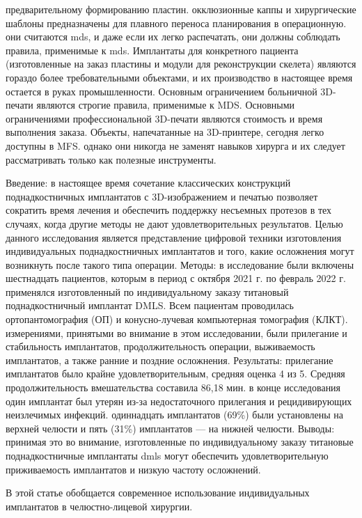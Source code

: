 предварительному формированию пластин. окклюзионные каппы и хирургические
шаблоны предназначены для плавного переноса планирования в операционную. они
считаются mds, и даже если их легко распечатать, они должны соблюдать правила,
применимые к mds. Имплантаты для конкретного пациента (изготовленные на заказ
пластины и модули для реконструкции скелета) являются гораздо более
требовательными объектами, и их производство в настоящее время остается в
руках промышленности. Основным ограничением больничной 3D-печати являются
строгие правила, применимые к MDS. Основными ограничениями профессиональной
3D-печати являются стоимость и время выполнения заказа. Объекты, напечатанные
на 3D-принтере, сегодня легко доступны в MFS. однако они никогда не заменят
навыков хирурга и их следует рассматривать только как полезные
инструменты.\cite{28732777}

Введение: в настоящее время сочетание классических конструкций поднадкостничных
имплантатов с 3D-изображением и печатью позволяет сократить время лечения и
обеспечить поддержку несъемных протезов в тех случаях, когда другие методы не
дают удовлетворительных результатов. Целью данного исследования является
представление цифровой техники изготовления индивидуальных поднадкостничных
имплантатов и того, какие осложнения могут возникнуть после такого типа
операции. Методы: в исследование были включены шестнадцать пациентов, которым в
период с октября 2021 г. по февраль 2022 г. применялся изготовленный по
индивидуальному заказу титановый поднадкостничный имплантат DMLS. Всем пациентам
проводилась ортопантомография (ОП) и конусно-лучевая компьютерная томография
(КЛКТ). измерениями, принятыми во внимание в этом исследовании, были прилегание
и стабильность имплантатов, продолжительность операции, выживаемость
имплантатов, а также ранние и поздние осложнения. Результаты: прилегание
имплантатов было крайне удовлетворительным, средняя оценка 4 из 5. Средняя
продолжительность вмешательства составила 86,18 мин. в конце исследования один
имплантат был утерян из-за недостаточного прилегания и рецидивирующих
неизлечимых инфекций. одиннадцать имплантатов (69\%) были установлены на верхней
челюсти и пять (31\%) имплантатов — на нижней челюсти. Выводы: принимая это во
внимание, изготовленные по индивидуальному заказу титановые поднадкостничные
имплантаты dmls могут обеспечить удовлетворительную приживаемость
имплантатов и низкую частоту осложнений.\cite{36292220}

В этой статье обобщается современное использование индивидуальных имплантатов в
челюстно-лицевой хирургии.\cite{31481289}

